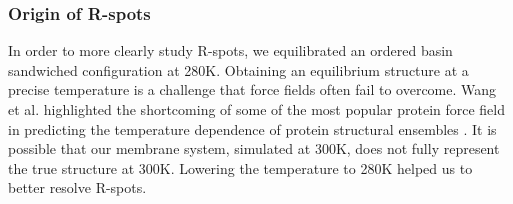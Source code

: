\documentclass[journal=jpcbfk,manuscript=article]{achemso}
\begin{document}
%

  \subsubsection{Origin of R-spots}\label{section:rspots}

  In order to more clearly study R-spots, we equilibrated an ordered basin sandwiched 
  configuration at 280K. Obtaining an equilibrium structure at a precise temperature is
  a challenge that force fields often fail to overcome. Wang et al. highlighted the 
  shortcoming of some of the most popular protein force field in predicting the temperature
  dependence of protein structural ensembles \cite{wang_building_2017}. It is possible that   %
  our membrane system, simulated at 300K, does not fully represent the true structure at 300K.
  Lowering the temperature to 280K helped us to better resolve R-spots. 
  
 
\end{document}
